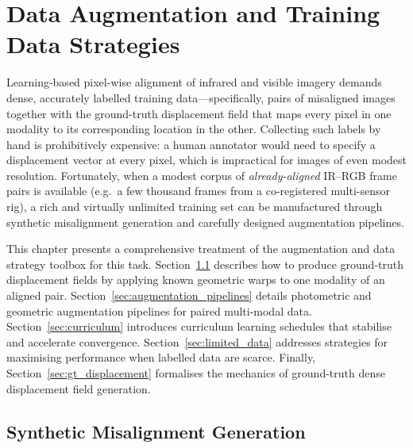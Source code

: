 
\chapter{Data Augmentation and Training Data Strategies}
\label{ch:data_augmentation}

Learning-based pixel-wise alignment of infrared and visible imagery demands
dense, accurately labelled training data---specifically, pairs of misaligned
images together with the ground-truth displacement field that maps every pixel
in one modality to its corresponding location in the other.  Collecting such
labels by hand is prohibitively expensive: a human annotator would need to
specify a displacement vector at every pixel, which is impractical for images
of even modest resolution.  Fortunately, when a modest corpus of
\emph{already-aligned} IR--RGB frame pairs is available (e.g.\ a few thousand
frames from a co-registered multi-sensor rig), a rich and virtually
unlimited training set can be manufactured through synthetic misalignment
generation and carefully designed augmentation pipelines.

This chapter presents a comprehensive treatment of the augmentation and
data strategy toolbox for this task.  Section~\ref{sec:synthetic_misalign}
describes how to produce ground-truth displacement fields by applying known
geometric warps to one modality of an aligned pair.
Section~\ref{sec:augmentation_pipelines} details photometric and geometric
augmentation pipelines for paired multi-modal data.
Section~\ref{sec:curriculum} introduces curriculum learning schedules that
stabilise and accelerate convergence.
Section~\ref{sec:limited_data} addresses strategies for maximising
performance when labelled data are scarce.  Finally,
Section~\ref{sec:gt_displacement} formalises the mechanics of ground-truth
dense displacement field generation.


\section{Synthetic Misalignment Generation}
\label{sec:synthetic_misalign}

